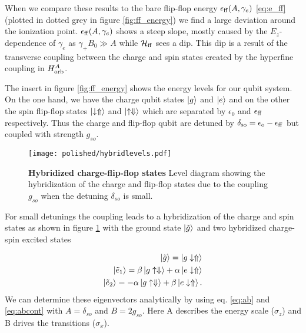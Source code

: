 When we compare these results to the bare flip-flop energy $\epsilon_{\rm{ff}}(A,\gamma_e)$ \eqref{eq:e_ff} (plotted in dotted grey in figure \ref{fig:ff_energy}) we find a large deviation around the ionization point. $\epsilon_{\rm{ff}}(A,\gamma_e)$ shows a steep slope, mostly caused by the $E_z$-dependence of $\gamma_e$ as $\gamma_+B_0\gg A$ while $\mathcal{H}_{\rm{ff}}$ sees a dip. This dip is a result of the transverse coupling between the charge and spin states created by the hyperfine coupling in $H_{\rm{orb}}^A$. 

The insert in figure \ref{fig:ff_energy} shows the energy levels for our qubit system. On the one hand, we have the charge qubit states $\ket{g}$ and $\ket{e}$ and on the other the spin flip-flop states $\ket{\downarrow\Uparrow}$ and $\ket{\uparrow\Downarrow}$ which are separated by $\epsilon_0$ and $\epsilon_{\rm{ff}}$ respectively. Thus the charge and flip-flop qubit are detuned by $\delta_{\rm so}=\epsilon_{\rm o} - \epsilon_{\rm ff}$ but coupled with strength $g_{so}$. 

\begin{figure}[h]
	\centering
	\texttt{[image: polished/hybridlevels.pdf]}
	\caption[Hybridized charge-flip-flop states]{\textbf{Hybridized charge-flip-flop states} Level diagram showing the hybridization of the charge and flip-flop states due to the coupling $g_{so}$ when the detuning $\delta_{so}$ is small.}
	\label{fig:hybridlevels}
\end{figure}

For small detunings the coupling leads to a hybridization of the charge and spin states as shown in figure \ref{fig:hybridlevels} with the ground state $\ket{\tilde{g}}$ and two hybridized charge-spin excited states

\begin{equation}
\label{eq:ff_hybrid}
\begin{aligned}
\ket{\tilde{g}}=\ket{g\downarrow\Uparrow}\\
\ket{\tilde{e}_1}=\beta\ket{g\uparrow\Downarrow}+\alpha\ket{e\downarrow\Uparrow}\\
\ket{\tilde{e}_2}=-\alpha\ket{g\uparrow\Downarrow}+\beta\ket{e\downarrow\Uparrow}.
\end{aligned}
\end{equation}
We can determine these eigenvectors analytically by using eq. \eqref{eq:ab} and \eqref{eq:abcont} with $A=\delta_{so}$ and $B=2g_{so}$.  Here A describes the energy scale ($\sigma_z$) and B drives the transitions ($\sigma_x$). 

